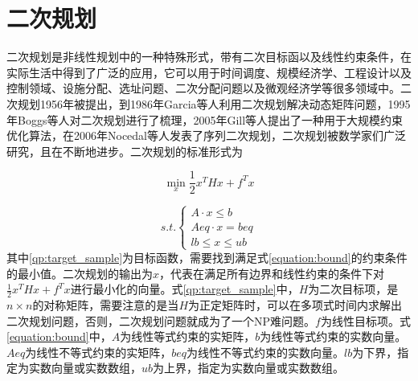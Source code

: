 \section{二次规划}
二次规划是非线性规划中的一种特殊形式，带有二次目标函以及线性约束条件，在实际生活中得到了广泛的应用，它可以用于时间调度、规模经济学、工程设计以及控制领域、设施分配、选址问题、二次分配问题以及微观经济学等很多领域中。二次规划1956年被提出，到1986年Garcia等人\cite{Garcia_1986}利用二次规划解决动态矩阵问题，1995年Boggs等人\cite{Boggs_1995}对二次规划进行了梳理，2005年Gill等人\cite{Gill_2001}提出了一种用于大规模约束优化算法，在2006年Nocedal等人\cite{Nocedal_2006}发表了序列二次规划，二次规划被数学家们广泛研究，且在不断地进步。二次规划的标准形式为
%

\begin{equation}
	\label{qp:target_sample}
	\min_{x} \frac{1}{2}x^THx+f^Tx
\end{equation}

\begin{equation}
	s.t.
	\begin{cases}
		A \cdot x \leq b \\
		Aeq \cdot x  = beq \\
		lb \leq x \leq ub
	\end{cases}
	\label{equation:bound}
\end{equation}
其中\ref{qp:target_sample}为目标函数，需要找到满足式\ref{equation:bound}的约束条件的最小值。二次规划的输出为${x}$，代表在满足所有边界和线性约束的条件下对${\frac{1}{2}x^THx+f^Tx}$进行最小化的向量。式\ref{qp:target_sample}中，$H$为二次目标项，是${n \times n}$的对称矩阵，需要注意的是当${H}$为正定矩阵时，可以在多项式时间内求解出二次规划问题，否则，二次规划问题就成为了一个NP难问题。${f}$为线性目标项。式\ref{equation:bound}中，${A}$为线性等式约束的实矩阵，${b}$为线性等式约束的实数向量。${Aeq}$为线性不等式约束的实矩阵，${beq}$为线性不等式约束的实数向量。${lb}$为下界，指定为实数向量或实数数组，${ub}$为上界，指定为实数向量或实数数组。



